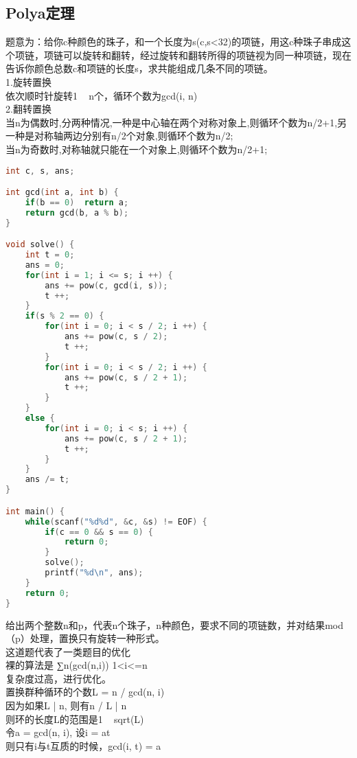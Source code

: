 \subsection{Polya定理}
题意为：给你c种颜色的珠子，和一个长度为s(c,s<32)的项链，用这c种珠子串成这个项链，项链可以旋转和翻转，经过旋转和翻转所得的项链视为同一种项链，现在告诉你颜色总数c和项链的长度s，求共能组成几条不同的项链。\\
1.旋转置换\\
    依次顺时针旋转1 ~ n个，循环个数为gcd(i, n)\\
2.翻转置换\\
    当n为偶数时,分两种情况,一种是中心轴在两个对称对象上,则循环个数为n/2+1,另一种是对称轴两边分别有n/2个对象,则循环个数为n/2;\\
    当n为奇数时,对称轴就只能在一个对象上,则循环个数为n/2+1;\\
    \begin{lstlisting}[language=c++]
int c, s, ans;

int gcd(int a, int b) {
    if(b == 0)  return a;
    return gcd(b, a % b);
}

void solve() {
    int t = 0;
    ans = 0;
    for(int i = 1; i <= s; i ++) {
        ans += pow(c, gcd(i, s));
        t ++;
    }
    if(s % 2 == 0) {
        for(int i = 0; i < s / 2; i ++) {
            ans += pow(c, s / 2);
            t ++;
        }
        for(int i = 0; i < s / 2; i ++) {
            ans += pow(c, s / 2 + 1);
            t ++;
        }
    }
    else {
        for(int i = 0; i < s; i ++) {
            ans += pow(c, s / 2 + 1);
            t ++;
        }
    }
    ans /= t;
}

int main() {
    while(scanf("%d%d", &c, &s) != EOF) {
        if(c == 0 && s == 0) {
            return 0;
        }
        solve();
        printf("%d\n", ans);
    }
    return 0;
}
    \end{lstlisting}
给出两个整数n和p，代表n个珠子，n种颜色，要求不同的项链数，并对结果mod（p）处理，置换只有旋转一种形式。\\
这道题代表了一类题目的优化\\
裸的算法是 ∑n(gcd(n,i)) 1<i<=n\\
复杂度过高，进行优化。\\
置换群种循环的个数L = n / gcd(n, i)\\
因为如果L | n, 则有n / L | n\\
则环的长度L的范围是1 ~ sqrt(L)\\
令a = gcd(n, i), 设i = at\\
则只有i与t互质的时候，gcd(i, t) = a\\
